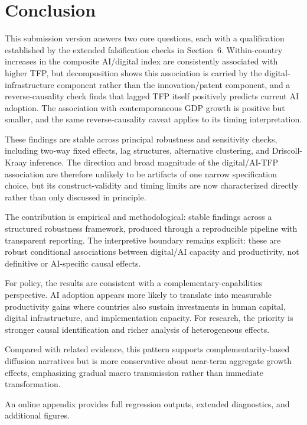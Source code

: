 \section{Conclusion}

This submission version answers two core questions, each with a qualification established by the extended falsification checks in Section~6. Within-country increases in the composite AI/digital index are consistently associated with higher TFP, but decomposition shows this association is carried by the digital-infrastructure component rather than the innovation/patent component, and a reverse-causality check finds that lagged TFP itself positively predicts current AI adoption. The association with contemporaneous GDP growth is positive but smaller, and the same reverse-causality caveat applies to its timing interpretation.

These findings are stable across principal robustness and sensitivity checks, including two-way fixed effects, lag structures, alternative clustering, and Driscoll-Kraay inference. The direction and broad magnitude of the digital/AI-TFP association are therefore unlikely to be artifacts of one narrow specification choice, but its construct-validity and timing limits are now characterized directly rather than only discussed in principle.

The contribution is empirical and methodological: stable findings across a structured robustness framework, produced through a reproducible pipeline with transparent reporting. The interpretive boundary remains explicit: these are robust conditional associations between digital/AI capacity and productivity, not definitive or AI-specific causal effects.

For policy, the results are consistent with a complementary-capabilities perspective. AI adoption appears more likely to translate into measurable productivity gains where countries also sustain investments in human capital, digital infrastructure, and implementation capacity. For research, the priority is stronger causal identification and richer analysis of heterogeneous effects.

Compared with related evidence, this pattern supports complementarity-based diffusion narratives but is more conservative about near-term aggregate growth effects, emphasizing gradual macro transmission rather than immediate transformation.

An online appendix provides full regression outputs, extended diagnostics, and additional figures.
